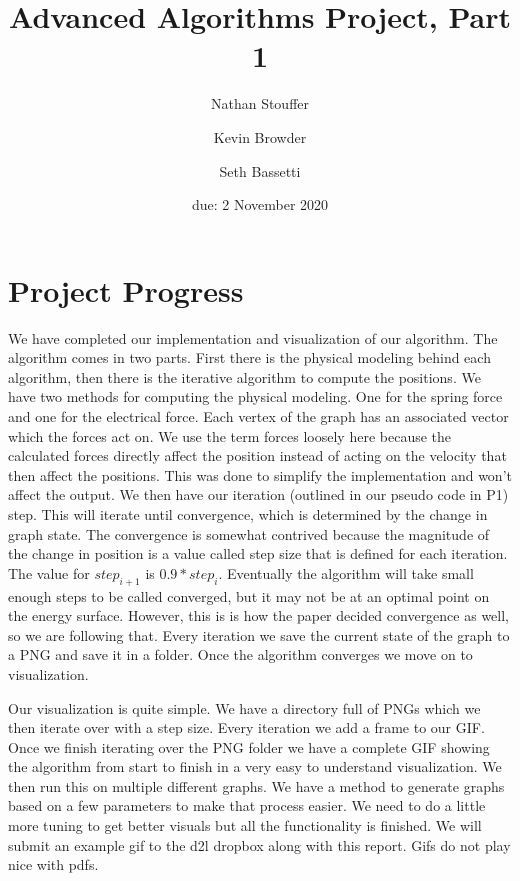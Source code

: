 \documentclass{article}
\title{Advanced Algorithms Project, Part 1}
\author{Nathan Stouffer \and Kevin Browder \and Seth Bassetti}
\date{due: 2 November 2020}
\begin{document}
\maketitle

\section{Project Progress}
We have completed our implementation and visualization of our algorithm. The algorithm comes in two parts. First there is the physical modeling behind each algorithm, then there is the iterative algorithm to compute the positions. We have two methods for computing the physical modeling. One for the spring force and one for the electrical force. Each vertex of the graph has an associated vector which the forces act on. We use the term forces loosely here because the calculated forces directly affect the position instead of acting on the velocity that then affect the positions. This was done to simplify the implementation and won't affect the output. We then have our iteration (outlined in our pseudo code in P1) step. This will iterate until convergence, which is determined by the change in graph state. The convergence is somewhat contrived because the magnitude of the change in position is a value called step size that is defined for each iteration. The value for $step_{i+1}$ is $0.9 * step_i$. Eventually the algorithm will take small enough steps to be called converged, but it may not be at an optimal point on the energy surface. However, this is is how the paper decided convergence as well, so we are following that. Every iteration we save the current state of the graph to a PNG and save it in a folder. Once the algorithm converges we move on to visualization.

Our visualization is quite simple. We have a directory full of PNGs which we then iterate over with a step size. Every iteration we add a frame to our GIF. Once we finish iterating over the PNG folder we have a complete GIF showing the algorithm from start to finish in a very easy to understand visualization. We then run this on multiple different graphs. We have a method to generate graphs based on a few parameters to make that process easier. We need to do a little more tuning to get better visuals but all the functionality is finished. We will submit an example gif to the d2l dropbox along with this report. Gifs do not play nice with pdfs.
\end{document}
